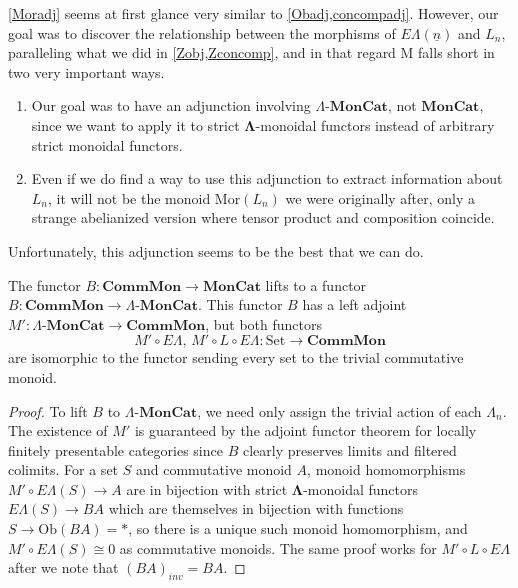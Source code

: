 \documentclass{amsbook} %
\newcommand{\mb}{\mathbf}
\newcommand{\Set}{\ensuremath{\textrm{Set}}}
\newcommand{\ML}{\mathbf{\Lambda}}
\newcommand{\EL}{E\Lambda}
\newcommand{\ELn}{E\Lambda(\underline{n})}
\newcommand{\ob}{\textrm{Ob}}
\newcommand{\lmc}{\Lambda\mbox{-}\mb{MonCat}}
\newcommand{\sets}{\Set}
\newcommand{\cmon}{\ensuremath{\mb{CommMon}}}
\newcommand{\moncat}{\ensuremath{\mb{MonCat}}}
\numberwithin{section}{chapter}
\begin{document}
\cref{Moradj} seems at first glance very similar to \cref{Obadj,concompadj}. However, our goal was to discover the relationship between the morphisms of $\ELn$ and $L_n$, paralleling what we did in \cref{Zobj,Zconcomp}, and in that regard $\mathrm{M}$ falls short in two very important ways. 

\begin{enumerate}
\item Our goal was to have an adjunction involving $\lmc$, not $\moncat$, since we want to apply it to strict $\ML$-monoidal functors instead of arbitrary strict monoidal functors. %
\item Even if we do find a way to use this adjunction to extract information about $L_n$, it will not be the monoid $\mathrm{Mor}(L_n)$ we were originally after, only a strange abelianized version where tensor product and composition coincide.  
\end{enumerate} 

Unfortunately, this adjunction seems to be the best that we can do. 
\begin{prop}
The functor $B:\cmon \to \moncat$ lifts to a functor $B:\cmon \to \lmc$. This functor $B$ has a left adjoint $M':\lmc \to \cmon$, but both functors
\[
M' \circ \EL, \, M' \circ L \circ \EL : \sets \to \cmon
\]
are isomorphic to the functor sending every set to the trivial commutative monoid.
\end{prop}
\begin{proof}
To lift $B$ to $\lmc$, we need only assign the trivial action of each $\Lambda_n$. The existence of $M'$ is guaranteed by the adjoint functor theorem for locally finitely presentable categories since $B$ clearly preserves limits and filtered colimits.  For a set $S$ and commutative monoid $A$, monoid homomorphisms $M' \circ \EL(S) \to A$ are in bijection with strict $\ML$-monoidal functors $\EL(S) \to BA$ which are themselves in bijection with functions $S \to \ob(BA) = *$, so there is a unique such monoid homomorphism, and $M' \circ \EL(S) \cong 0$ as commutative monoids. The same proof works for $M' \circ L \circ \EL$ after we note that $(BA)_{inv} = BA$.
\end{proof}
\end{document}
